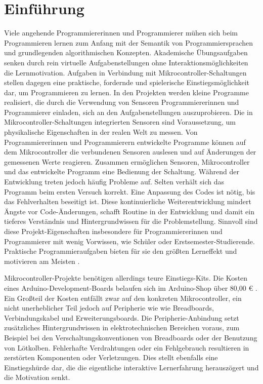 \documentclass[11pt,a4paper]{report}
\begin{document}
\chapter{Einführung} \label{chap:intro}
Viele angehende Programmiererinnen und Programmierer mühen sich beim Programmieren lernen zum Anfang mit der Semantik von Programmiersprachen und grundlegenden algorithmischen Konzepten.
Akademische Übungsaufgaben senken durch rein virtuelle Aufgabenstellungen ohne Interaktionsmöglichkeiten die Lernmotivation.
Aufgaben in Verbindung mit Mikrocontroller-Schaltungen stellen dagegen eine praktische, fordernde und spielerische Einstiegsmöglichkeit dar, um Programmieren zu lernen.
In den Projekten werden kleine Programme realisiert, die durch die Verwendung von Sensoren Programmiererinnen und Programmierer einladen, sich an den Aufgabenstellungen auszuprobieren.
Die in Mikrocontroller-Schaltungen integrierten Sensoren sind Voraussetzung, um physikalische Eigenschaften in der realen Welt zu messen.
Von Programmiererinnen und Programmierern entwickelte Programme können auf dem Mikrocontroller die verbundenen Sensoren auslesen und auf Änderungen der gemessenen Werte reagieren.
Zusammen ermöglichen Sensoren, Mikrocontroller und das entwickelte Programm eine Bedienung der Schaltung.
Während der Entwicklung treten jedoch häufig Probleme auf.
Selten verhält sich das Programm beim ersten Versuch korrekt.
Eine Anpassung des Codes ist nötig, bis das Fehlverhalten beseitigt ist.
Diese kontinuierliche Weiterentwicklung mindert Ängste vor Code-Änderungen, schafft Routine in der Entwicklung und damit ein tieferes Verständnis und Hintergrundwissen für die Problemstellung.
Sinnvoll sind diese Projekt-Eigenschaften insbesondere für Programmiererinnen und Programmierer mit wenig Vorwissen, wie Schüler oder Erstsemester-Studierende.
Praktische Programmieraufgaben bieten für sie den größten Lerneffekt und motivieren am Meisten \cite{learning_computer_programming}.

Mikrocontroller-Projekte benötigen allerdings teure Einstiegs-Kits.
Die Kosten eines Arduino-Development-Boards belaufen sich im Arduino-Shop über 80,00 € \cite{arduino_kit}.
Ein Großteil der Kosten entfällt zwar auf den konkreten Mikrocontroller, ein nicht unerheblicher Teil jedoch auf Peripherie wie wie Breadboards, Verbindungskabel und Erweiterungsboards.
Die Peripherie-Anbindung setzt zusätzliches Hintergrundwissen in elektrotechnischen Bereichen voraus, zum  Beispiel bei den Verschaltungskonventionen von Breadboards oder der Benutzung von Lötkolben.
Fehlerhafte Verdrahtungen oder ein Fehlgebrauch resultieren in zerstörten Komponenten oder Verletzungen.
Dies stellt ebenfalls eine Einstiegshürde dar, die die eigentliche interaktive Lernerfahrung herauszögert und die Motivation senkt.
\end{document}
